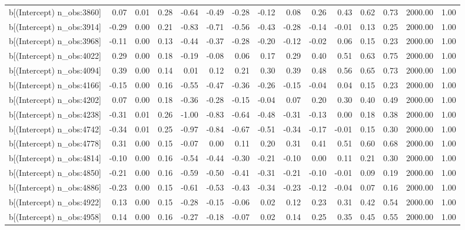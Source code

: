 \begin{table}[ht]
\begin{tabular}{rrrrrrrrrrrrrrr}
  b[(Intercept) n\_obs:3860] & 0.07 & 0.01 & 0.28 & -0.64 & -0.49 & -0.28 & -0.12 & 0.08 & 0.26 & 0.43 & 0.62 & 0.73 & 2000.00 & 1.00 \\ 
  b[(Intercept) n\_obs:3914] & -0.29 & 0.00 & 0.21 & -0.83 & -0.71 & -0.56 & -0.43 & -0.28 & -0.14 & -0.01 & 0.13 & 0.25 & 2000.00 & 1.00 \\ 
  b[(Intercept) n\_obs:3968] & -0.11 & 0.00 & 0.13 & -0.44 & -0.37 & -0.28 & -0.20 & -0.12 & -0.02 & 0.06 & 0.15 & 0.23 & 2000.00 & 1.00 \\ 
  b[(Intercept) n\_obs:4022] & 0.29 & 0.00 & 0.18 & -0.19 & -0.08 & 0.06 & 0.17 & 0.29 & 0.40 & 0.51 & 0.63 & 0.75 & 2000.00 & 1.00 \\ 
  b[(Intercept) n\_obs:4094] & 0.39 & 0.00 & 0.14 & 0.01 & 0.12 & 0.21 & 0.30 & 0.39 & 0.48 & 0.56 & 0.65 & 0.73 & 2000.00 & 1.00 \\ 
  b[(Intercept) n\_obs:4166] & -0.15 & 0.00 & 0.16 & -0.55 & -0.47 & -0.36 & -0.26 & -0.15 & -0.04 & 0.04 & 0.15 & 0.23 & 2000.00 & 1.00 \\ 
  b[(Intercept) n\_obs:4202] & 0.07 & 0.00 & 0.18 & -0.36 & -0.28 & -0.15 & -0.04 & 0.07 & 0.20 & 0.30 & 0.40 & 0.49 & 2000.00 & 1.00 \\ 
  b[(Intercept) n\_obs:4238] & -0.31 & 0.01 & 0.26 & -1.00 & -0.83 & -0.64 & -0.48 & -0.31 & -0.13 & 0.00 & 0.18 & 0.38 & 2000.00 & 1.00 \\ 
  b[(Intercept) n\_obs:4742] & -0.34 & 0.01 & 0.25 & -0.97 & -0.84 & -0.67 & -0.51 & -0.34 & -0.17 & -0.01 & 0.15 & 0.30 & 2000.00 & 1.00 \\ 
  b[(Intercept) n\_obs:4778] & 0.31 & 0.00 & 0.15 & -0.07 & 0.00 & 0.11 & 0.20 & 0.31 & 0.41 & 0.51 & 0.60 & 0.68 & 2000.00 & 1.00 \\ 
  b[(Intercept) n\_obs:4814] & -0.10 & 0.00 & 0.16 & -0.54 & -0.44 & -0.30 & -0.21 & -0.10 & 0.00 & 0.11 & 0.21 & 0.30 & 2000.00 & 1.00 \\ 
  b[(Intercept) n\_obs:4850] & -0.21 & 0.00 & 0.16 & -0.59 & -0.50 & -0.41 & -0.31 & -0.21 & -0.10 & -0.01 & 0.09 & 0.19 & 2000.00 & 1.00 \\ 
  b[(Intercept) n\_obs:4886] & -0.23 & 0.00 & 0.15 & -0.61 & -0.53 & -0.43 & -0.34 & -0.23 & -0.12 & -0.04 & 0.07 & 0.16 & 2000.00 & 1.00 \\ 
  b[(Intercept) n\_obs:4922] & 0.13 & 0.00 & 0.15 & -0.28 & -0.15 & -0.06 & 0.02 & 0.12 & 0.23 & 0.31 & 0.42 & 0.54 & 2000.00 & 1.00 \\ 
  b[(Intercept) n\_obs:4958] & 0.14 & 0.00 & 0.16 & -0.27 & -0.18 & -0.07 & 0.02 & 0.14 & 0.25 & 0.35 & 0.45 & 0.55 & 2000.00 & 1.00 \\ 

\end{tabular}
\end{table}
